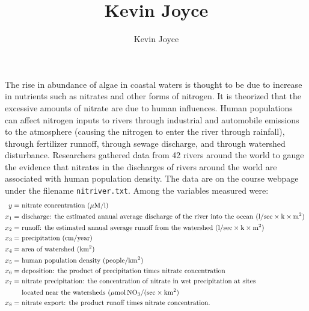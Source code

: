 \documentclass{homework}
\title{Kevin Joyce}
\author{Kevin Joyce}
\begin{document}
 
\newcommand{\figref}[1]{\figurename~\ref{#1}}
\renewcommand{\bar}{\overline}
\renewcommand{\hat}{\widehat}
\renewcommand{\SS}{\mathcal S}
\newcommand{\HH}{\mathscr H}
\newcommand{\mom}{\widetilde}
\newcommand{\mle}{\widehat \Uptheta}
\newcommand{\eps}{\varepsilon}
\newcommand{\todist}{\stackrel{D}\longrightarrow}
\newcommand{\toprob}{\stackrel{p}\longrightarrow}
\newcommand{\TTheta}{\overline{\underline \Theta} }
\newcommand{\del}{\partial}
\newcommand{\approxsim}{\overset{\cdotp}{\underset{\cdotp}{\sim}}}
\newcommand{\RSS}{\ensuremath{\mathrm{RSS}}}
\newcommand{\MSE}{\ensuremath{\mathrm{MSE}}}
\newcommand{\SE}{\ensuremath{\mathrm{SE}}}
\newcommand{\TSS}{\ensuremath{\mathrm{TSS}}}
\newcommand{\SSReg}{\ensuremath{\mathrm{SSReg}}}
\begin{longproblem}
The rise in abundance of algae in coastal waters is thought to be due to increase
in nutrients such as nitrates and other forms of nitrogen.  It is theorized
that the excessive amounts of nitrate are due to human influences.  Human
populations can affect nitrogen inputs to rivers through industrial and
automobile emissions to the atmosphere (causing the nitrogen to enter the river
through rainfall), through fertilizer runnoff, through sewage discharge, and
through watershed disturbance.  Researchers gathered data from 42 rivers around
the world to gauge the evidence that nitrates in the discharges of rivers
around the world are associated with human population density. The data are on
the course webpage under the filename \texttt{nitriver.txt}.  Among the
variables measured were:
\begin{align*}
  y   = &\text{ nitrate concentration (\unit{$\mu$M/l})}\\
  x_1 = &\text{ discharge: the estimated annual average discharge of the river into the ocean 
  ($\mathrm l/\mathrm{sec} \times \mathrm k \times \mathrm m^2$) }\\
  x_2 = &\text{ runoff: the estimated annual average runoff from the watershed ($\mathrm l/\mathrm{sec} \times \mathrm k \times \mathrm m^2$) }\\
  x_3 = &\text{ precipitation (cm/year) }\\
  x_4 = &\text{ area of watershed ($\mathrm{km^2}$) }\\
  x_5 = &\text{ human population density } (\mathrm{people}/\mathrm{km}^2)\\
  x_6 = &\text{ deposition: the product of precipitation times nitrate concentration}\\
  x_7 = &\text{ nitrate precipitation:  the concentration of nitrate in wet precipitation at sites }\\
       &\text{ located near the watersheds }(\mu\mathrm{mol}\,\mathrm{NO}_3/(\mathrm{sec}\times\mathrm{km}^2)\\
  x_8 = &\text{ nitrate export: the product runoff times nitrate concentration. }\\
\end{align*}


\end{longproblem}
\end{document}
